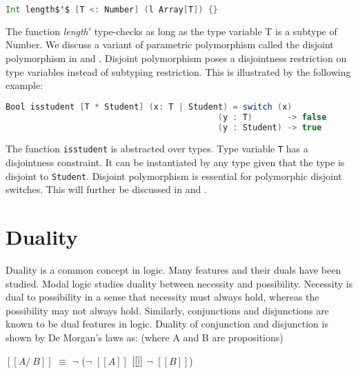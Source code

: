 \begin{lstlisting}[language=Scala,mathescape]
  Int length$'$ [T <: Number] (l Array[T]) {}
\end{lstlisting}

\noindent The function \emph{length$'$} type-checks as long as the type
variable T is a subtype of Number.
We discuss a variant of parametric polymorphism called
the disjoint polymorphism in  and
. Disjoint polymorphism
poses a disjointness restriction on type variables
instead of subtyping restriction. This is illustrated by
the following example:

\begin{lstlisting}[language=Scala]
  Bool isstudent [T * Student] (x: T | Student) = switch (x)
                                           (y : T)       -> false
                                           (y : Student) -> true
\end{lstlisting}

\noindent The function \lstinline{isstudent} is abstracted over types.
Type variable \lstinline{T} has a disjointness constraint.
It can be instantiated by any type
given that the type is disjoint to \lstinline{Student}.
Disjoint polymorphism is essential for polymorphic disjoint
switches. This will further be discussed in  and
.






\section{Duality}
Duality is a common concept in logic. Many features and 
their duals have been studied.
Modal logic \citep{simpson1994proof,nanevski2008contextual} studies 
duality between necessity and possibility.
Necessity is dual to possibility in a sense 
that necessity must always
hold, whereas the possibility may not always hold.
Similarly, conjunctions and disjunctions are 
known to be dual features in logic.
Duality of conjunction and disjunction is 
shown by De Morgan's laws \citep{copi2018introduction} as:
(where A and B are propositions)

\begin{center}
  $[[A /\ B]]$ $\equiv$ $\neg$ ($\neg$ $[[A]]$ $[[\/]]$ $\neg$ $[[B]]$)
\end{center}

